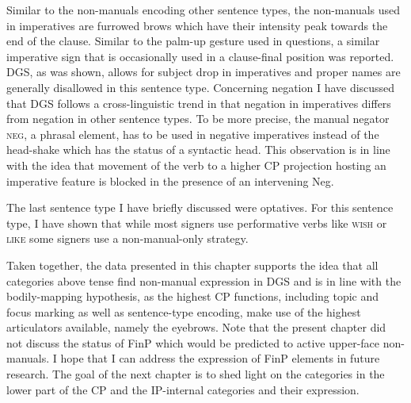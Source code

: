 Similar to the non-manuals encoding other sentence types, the non-manuals used in imperatives are furrowed brows which have their intensity peak towards the end of the clause. Similar to the palm-up gesture used in questions, a similar imperative sign that is occasionally used in a clause-final position was reported. DGS, as was shown, allows for subject drop in imperatives and proper names are generally disallowed in this sentence type. Concerning negation I have discussed that DGS follows a cross-linguistic trend in that negation in imperatives differs from negation in other sentence types. To be more precise, the manual negator \textsc{neg}, a phrasal element, has to be used in negative imperatives instead of the head-shake which has the status of a syntactic head. This observation is in line with the idea that movement of the verb to a higher CP projection hosting an imperative feature is blocked in the presence of an intervening Neg\textdegree .

The last sentence type I have briefly discussed were optatives. For this sentence type, I have shown that while most signers use performative verbs like \textsc{wish} or \textsc{like} some signers use a non-manual-only strategy. 

Taken together, the data presented in this chapter supports the idea that all categories above tense find non-manual expression in DGS and is in line with the bodily-mapping hypothesis, as the highest CP functions, including topic and focus marking as well as sentence-type encoding, make use of the highest articulators available, namely the eyebrows. Note that the present chapter did not discuss the status of FinP which would be predicted to active upper-face non-manuals. I hope that I can address the expression of FinP elements in future research. The goal of the next chapter is to shed light on the categories in the lower part of the CP and the IP-internal categories and their expression.


